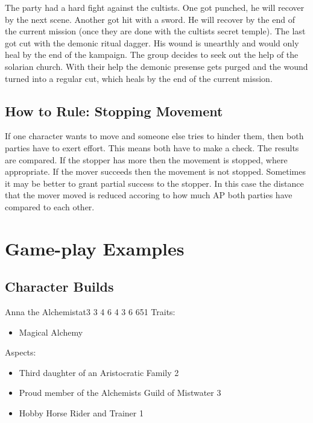 \documentclass[11pt]{article}
\begin{document}
{\begin{pwexample}
The party had a hard fight against the cultists. One got punched, he will recover by the next scene. Another got hit with a sword. He will recover by the end of the current mission (once they are done with the cultists secret temple). The last got cut with the demonic ritual dagger. His wound is unearthly and would only heal by the end of the kampaign. The group decides to seek out the help of the solarian church. With their help the demonic presense gets purged  and the wound turned into a regular cut, which heals by the end of the current mission.
\end{pwexample}

\subsection{How to Rule: Stopping Movement}
\label{sec:orgd8e51b3}
If one character wants to move and someone else tries to hinder them, then both parties have to exert effort. This means both have to make a check. The results are compared. If the stopper has more then the movement is stopped, where appropriate. If the mover succeeds then the movement is not stopped. Sometimes it may be better to grant partial success to the stopper. In this case the distance that the mover moved is reduced accoring to how much AP both parties have compared to each other.



\section{Game-play Examples}
\label{sec:orgf449525}
\subsection{Character Builds}
\label{sec:orgbeb881b}

\begin{npc}{Anna the Alchemist}{at}{3 3 4 6 4 3 6 6}{51}
Traits:
\begin{itemize}
\item Magical Alchemy
\end{itemize}
\columnbreak
Aspects:
\begin{itemize}
\item Third daughter of an Aristocratic Family 2
\item Proud member of the Alchemists Guild of Mistwater 3
\item Hobby Horse Rider and Trainer 1
\end{itemize}
\end{npc}

}
\end{document}
